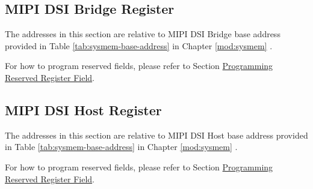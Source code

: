 \documentclass[main\_\_EN.tex]{subfiles}
\begin{document}
\subsection{MIPI DSI Bridge Register}
The addresses in this section are relative to MIPI DSI Bridge base address provided in Table \ref{tab:sysmem-base-address} in Chapter \ref{mod:sysmem} \textit{}.

For how to program reserved fields, please refer to Section \hyperref[programming-reserved-field]{Programming Reserved Register Field}.



\subsection{MIPI DSI Host Register}
The addresses in this section are relative to MIPI DSI Host base address provided in Table \ref{tab:sysmem-base-address} in Chapter \ref{mod:sysmem} \textit{}.

For how to program reserved fields, please refer to Section \hyperref[programming-reserved-field]{Programming Reserved Register Field}.


\end{document}
